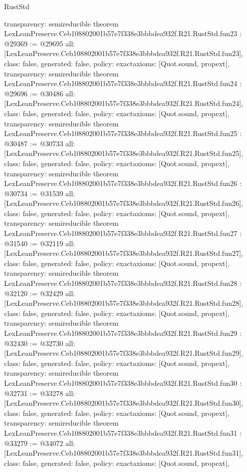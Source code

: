 \begin{lexlean}{RustStd}
\begin{coremodule}
{  transparency: semireducible
}
theorem LexLeanPreserve.Ceb108802001b57e7f338e3bbbdea932f.R21.RustStd.fun23 : @29369 := @29695 {
  all: [LexLeanPreserve.Ceb108802001b57e7f338e3bbbdea932f.R21.RustStd.fun23],
  class: false,
  generated: false,
  policy: exact{axioms: [Quot.sound, propext]},
  transparency: semireducible
}
theorem LexLeanPreserve.Ceb108802001b57e7f338e3bbbdea932f.R21.RustStd.fun24 : @29696 := @30486 {
  all: [LexLeanPreserve.Ceb108802001b57e7f338e3bbbdea932f.R21.RustStd.fun24],
  class: false,
  generated: false,
  policy: exact{axioms: [Quot.sound, propext]},
  transparency: semireducible
}
theorem LexLeanPreserve.Ceb108802001b57e7f338e3bbbdea932f.R21.RustStd.fun25 : @30487 := @30733 {
  all: [LexLeanPreserve.Ceb108802001b57e7f338e3bbbdea932f.R21.RustStd.fun25],
  class: false,
  generated: false,
  policy: exact{axioms: [Quot.sound, propext]},
  transparency: semireducible
}
theorem LexLeanPreserve.Ceb108802001b57e7f338e3bbbdea932f.R21.RustStd.fun26 : @30734 := @31539 {
  all: [LexLeanPreserve.Ceb108802001b57e7f338e3bbbdea932f.R21.RustStd.fun26],
  class: false,
  generated: false,
  policy: exact{axioms: [Quot.sound, propext]},
  transparency: semireducible
}
theorem LexLeanPreserve.Ceb108802001b57e7f338e3bbbdea932f.R21.RustStd.fun27 : @31540 := @32119 {
  all: [LexLeanPreserve.Ceb108802001b57e7f338e3bbbdea932f.R21.RustStd.fun27],
  class: false,
  generated: false,
  policy: exact{axioms: [Quot.sound, propext]},
  transparency: semireducible
}
theorem LexLeanPreserve.Ceb108802001b57e7f338e3bbbdea932f.R21.RustStd.fun28 : @32120 := @32429 {
  all: [LexLeanPreserve.Ceb108802001b57e7f338e3bbbdea932f.R21.RustStd.fun28],
  class: false,
  generated: false,
  policy: exact{axioms: [Quot.sound, propext]},
  transparency: semireducible
}
theorem LexLeanPreserve.Ceb108802001b57e7f338e3bbbdea932f.R21.RustStd.fun29 : @32430 := @32730 {
  all: [LexLeanPreserve.Ceb108802001b57e7f338e3bbbdea932f.R21.RustStd.fun29],
  class: false,
  generated: false,
  policy: exact{axioms: [Quot.sound, propext]},
  transparency: semireducible
}
theorem LexLeanPreserve.Ceb108802001b57e7f338e3bbbdea932f.R21.RustStd.fun30 : @32731 := @33278 {
  all: [LexLeanPreserve.Ceb108802001b57e7f338e3bbbdea932f.R21.RustStd.fun30],
  class: false,
  generated: false,
  policy: exact{axioms: [Quot.sound, propext]},
  transparency: semireducible
}
theorem LexLeanPreserve.Ceb108802001b57e7f338e3bbbdea932f.R21.RustStd.fun31 : @33279 := @34072 {
  all: [LexLeanPreserve.Ceb108802001b57e7f338e3bbbdea932f.R21.RustStd.fun31],
  class: false,
  generated: false,
  policy: exact{axioms: [Quot.sound, propext]},
}
\end{coremodule}
\end{lexlean}
